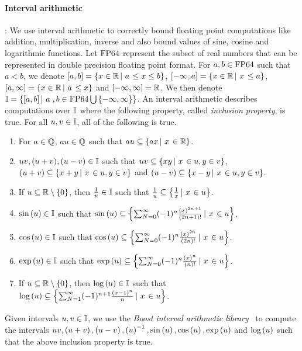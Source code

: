 \paragraph{Interval arithmetic}:  We use interval arithmetic to
correctly bound floating point computations like addition,
multiplication, inverse and also bound values of sine, cosine and
logarithmic functions.  Let $\operatorname{FP64}$ represent the subset of real
numbers that can be represented in double precision floating point
format.  For $a,b\in\operatorname{FP64}$ such that $a<b$, we denote
$\left[a,b\right] = \left\{x\in\mathbb{R}\left|~a\right.\leq x\leq b\right\}$,
$\left[-\infty,a\right] = \left\{x\in\mathbb{R}\left|~x\right.\leq a\right\}$,
$\left[a,\infty\right] = \left\{x\in\mathbb{R}\left|~a\right.\leq x\right\}$ and
$\left[-\infty,\infty\right] = \mathbb{R}$.  We then denote $\mathbb{I}
= \left\{\left[a,b\right]\left|~a\right.,b\in\operatorname{FP64}\bigcup\left\{-\infty,\infty\right\}\right\}$.
An interval arithmetic describes computations over $\mathbb{I}$ where
the following property, called \emph{inclusion property}, is true.
For all $u,v\in\mathbb{I}$, all of the following is true.
%
\begin{enumerate}
\item For $a\in\mathbb{Q}$, $au\in\mathbb{Q}$ such that $au\subseteq \left\{ax\left|~x\right.\in\mathbb{R}\right\}$.
\item $uv,(u+v),(u-v)\in\mathbb{I}$ such that
$uv\subseteq\left\{xy\left|~x\right.\in u, y\in v\right\}$,\\ $\left(u+v\right)\subseteq\left\{x+y\left|~x\right.\in
u, y\in v\right\}$ and $\left(u-v\right)\subseteq\left\{x-y\left|~x\right.\in u, y\in v\right\}$.
\item If $u\subseteq\mathbb{R}\setminus\left\{0\right\}$, then $\frac{1}{u}\in\mathbb{I}$ such that $\frac{1}{u}\subseteq\left\{\frac{1}{x}\left|~x\right.\in u\right\}$.
\item $\sin\left(u\right)\in\mathbb{I}$ such that $\sin\left(u\right)\subseteq\left\{\sum_{N=0}^\infty(-1)^n\frac{\left(x\right)^{2n+1}}{\left(2n+1\right)!}\left|~x\right.\in u\right\}$.
\item $\cos\left(u\right)\in\mathbb{I}$ such that $\cos\left(u\right)\subseteq\left\{\sum_{N=0}^\infty (-1)^n\frac{\left(x\right)^{2n}}{\left(2n\right)!}\left|~x\right.\in u\right\}$.
\item $\exp\left(u\right)\in\mathbb{I}$ such that $\exp\left(u\right)\subseteq\left\{\sum_{N=0}^\infty(-1)^n\frac{\left(x\right)^{n}}{\left(n\right)!}\left|~x\right.\in u\right\}$.
\item If $u\subseteq\mathbb{R}\setminus\left\{0\right\}$, then $\log\left(u\right)\in\mathbb{I}$ such that\\ $\log\left(u\right)\subseteq\left\{\sum_{N=1}^\infty(-1)^{n+1}\frac{\left(x-1\right)^{n}}{n}\left|~x\right.\in u\right\}$.
\end{enumerate}
%
Given intervals $u,v\in\mathbb{I}$, we use the \emph{Boost interval
arithmetic library}~\cite{bronnimann2006design} to compute the intervals
$uv, \left(u+v\right), \left(u-v\right), \left(u\right)^{-1}, \sin\left(u\right), \cos\left(u\right), \exp\left(u\right)$
and $\log\left(u\right)$ such that the above inclusion property is true.

